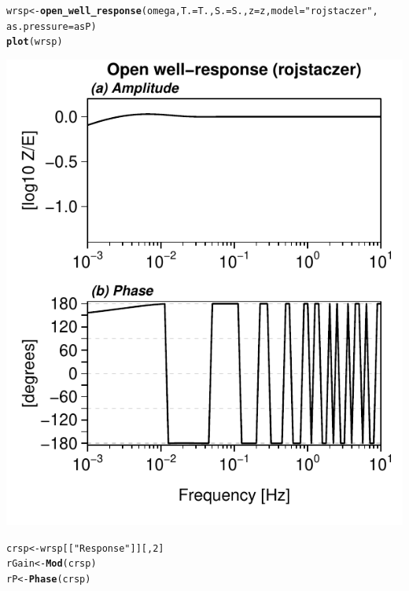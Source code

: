 \documentclass[12pt]{article}\usepackage[]{graphicx}\usepackage[]{color}
\makeatletter
\def\maxwidth{ %
  \ifdim\Gin@nat@width>\linewidth
    \linewidth
  \else
    \Gin@nat@width
  \fi
}
\newcommand{\hlnum}[1]{\textcolor[rgb]{0.686,0.059,0.569}{#1}}%
\newcommand{\hlstr}[1]{\textcolor[rgb]{0.192,0.494,0.8}{#1}}%
\newcommand{\hlstd}[1]{\textcolor[rgb]{0.345,0.345,0.345}{#1}}%
\newcommand{\hlkwb}[1]{\textcolor[rgb]{0.69,0.353,0.396}{#1}}%
\newcommand{\hlkwc}[1]{\textcolor[rgb]{0.333,0.667,0.333}{#1}}%
\newcommand{\hlkwd}[1]{\textcolor[rgb]{0.737,0.353,0.396}{\textbf{#1}}}%
\newenvironment{kframe}{%
 \def\at@end@of@kframe{}%
 \ifinner\ifhmode%
  \def\at@end@of@kframe{\end{minipage}}%
  \begin{minipage}{\columnwidth}%
 \fi\fi%
 \def\FrameCommand##1{\hskip\@totalleftmargin \hskip-\fboxsep
 \colorbox{shadecolor}{##1}\hskip-\fboxsep
     \hskip-\linewidth \hskip-\@totalleftmargin \hskip\columnwidth}%
 \MakeFramed {\advance\hsize-\width
   \@totalleftmargin\z@ \linewidth\hsize
   \@setminipage}}%
 {\par\unskip\endMakeFramed%
 \at@end@of@kframe}
\newenvironment{knitrout}{}{} %
\makeatother
\begin{document}
\begin{knitrout}\small
{}\color{fgcolor}\begin{kframe}
\begin{alltt}
\hlstd{wrsp} \hlkwb{<-} \hlkwd{open_well_response}\hlstd{(omega,} \hlkwc{T.} \hlstd{= T.,} \hlkwc{S.} \hlstd{= S.,} \hlkwc{z} \hlstd{= z,} \hlkwc{model} \hlstd{=} \hlstr{"rojstaczer"}\hlstd{,}
    \hlkwc{as.pressure} \hlstd{= asP)}
\hlkwd{plot}\hlstd{(wrsp)}
\end{alltt}
\end{kframe}
\includegraphics[width=\maxwidth]{figure/ROJRESP-1} 
\begin{kframe}\begin{alltt}
\hlstd{crsp} \hlkwb{<-} \hlstd{wrsp[[}\hlstr{"Response"}\hlstd{]][,} \hlnum{2}\hlstd{]}
\hlstd{rGain} \hlkwb{<-} \hlkwd{Mod}\hlstd{(crsp)}
\hlstd{rP} \hlkwb{<-} \hlkwd{Phase}\hlstd{(crsp)}
\end{alltt}
\end{kframe}
\end{knitrout}
\end{document}

